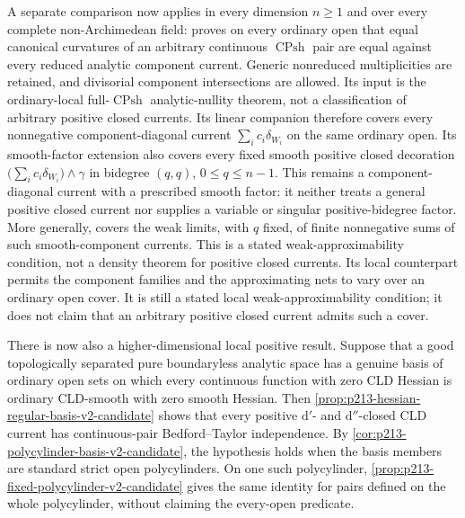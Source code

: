 A separate comparison now applies in every dimension \(n\geq1\) and over
every complete non-Archimedean field:
 proves on every ordinary open
that equal canonical curvatures of an arbitrary continuous
\(\operatorname{CPsh}\) pair are equal against every reduced analytic
component current.  Generic nonreduced multiplicities are retained, and
divisorial component intersections are allowed.  Its input is the
ordinary-local full-\(\operatorname{CPsh}\) analytic-nullity theorem, not a
classification of arbitrary positive closed currents.  Its linear companion
 therefore covers every
nonnegative component-diagonal current
\(\sum_i c_i\delta_{W_i}\) on the same ordinary open.  Its smooth-factor
extension  also covers every
fixed smooth positive closed decoration
\(\bigl(\sum_i c_i\delta_{W_i}\bigr)\wedge\gamma\) in bidegree
\((q,q)\), \(0\leq q\leq n-1\).  This remains a component-diagonal
current with a prescribed smooth factor: it neither treats a general
positive closed current nor supplies a variable or singular
positive-bidegree factor.  More generally,
 covers the weak limits, with
\(q\) fixed, of finite nonnegative sums of such smooth-component currents.
This is a stated weak-approximability condition, not a density theorem for
positive closed currents.  Its local counterpart
 permits the component
families and the approximating nets to vary over an ordinary open cover.  It
is still a stated local weak-approximability condition; it does not claim
that an arbitrary positive closed current admits such a cover.



There is now also a higher-dimensional local positive result.  Suppose that
a good topologically separated pure boundaryless analytic space has a
genuine basis of ordinary open sets on which every continuous function with
zero CLD Hessian is ordinary CLD-smooth with zero smooth Hessian.  Then
\cref{prop:p213-hessian-regular-basis-v2-candidate} shows that every positive
\(\mathrm d'\)- and \(\mathrm d''\)-closed CLD current has
continuous-pair Bedford--Taylor independence.  By
\cref{cor:p213-polycylinder-basis-v2-candidate}, the hypothesis holds when
the basis members are standard strict open polycylinders.  On one such
polycylinder, \cref{prop:p213-fixed-polycylinder-v2-candidate} gives the
same identity for pairs defined on the whole polycylinder, without claiming
the every-open predicate.

